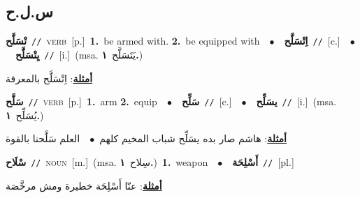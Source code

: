 \documentclass[10pt,a4paper,twoside]{article} %
\begin{document}
\begin{multicols}{2}
\vspace{-3mm}
\subsection*{\color{blue}\foreignlanguage{arabic}{س.ل.ح}\color{blue}{}} 

{\setlength\topsep{0pt}\textbf{\foreignlanguage{arabic}{تْسَلَّح}}\ {\color{gray}\texttt{//}\color{black}}\ \textsc{verb}\ [p.]\ \textbf{1.}~be armed with.  \textbf{2.}~be equipped with\ \ $\bullet$\ \ \setlength\topsep{0pt}\textbf{\foreignlanguage{arabic}{اِتْسَلَّح}}\ {\color{gray}\texttt{//}\color{black}}\ [c.]\ \ $\bullet$\ \ \setlength\topsep{0pt}\textbf{\foreignlanguage{arabic}{يِتْسَلَّح}}\ {\color{gray}\texttt{//}\color{black}}\ [i.]\ \color{gray}(msa. \foreignlanguage{arabic}{يَتَسَلَّح}~\foreignlanguage{arabic}{\textbf{١.}})\color{black}\  \begin{flushright}\color{gray}\foreignlanguage{arabic}{\textbf{\underline{\foreignlanguage{arabic}{أمثلة}}}: اِتْسَلَّح بالمعرفة}\end{flushright}\color{black}} \vspace{2mm}

{\setlength\topsep{0pt}\textbf{\foreignlanguage{arabic}{سَلَّح}}\ {\color{gray}\texttt{//}\color{black}}\ \textsc{verb}\ [p.]\ \textbf{1.}~arm  \textbf{2.}~equip\ \ $\bullet$\ \ \setlength\topsep{0pt}\textbf{\foreignlanguage{arabic}{سَلِّح}}\ {\color{gray}\texttt{//}\color{black}}\ [c.]\ \ $\bullet$\ \ \setlength\topsep{0pt}\textbf{\foreignlanguage{arabic}{يسَلِّح}}\ {\color{gray}\texttt{//}\color{black}}\ [i.]\ \color{gray}(msa. \foreignlanguage{arabic}{يُسَلِّح}~\foreignlanguage{arabic}{\textbf{١.}})\color{black}\  \begin{flushright}\color{gray}\foreignlanguage{arabic}{\textbf{\underline{\foreignlanguage{arabic}{أمثلة}}}: هاشم صار بده يسَلِّح شباب المخيم كلهم\ $\bullet$\ \  العلم سَلَّحنا بالقوة}\end{flushright}\color{black}} \vspace{2mm}

{\setlength\topsep{0pt}\textbf{\foreignlanguage{arabic}{سْلَاح}}\ {\color{gray}\texttt{//}\color{black}}\ \textsc{noun}\ [m.]\ \color{gray}(msa. \foreignlanguage{arabic}{سِلاح}~\foreignlanguage{arabic}{\textbf{١.}})\color{black}\ \textbf{1.}~weapon\ \ $\bullet$\ \ \setlength\topsep{0pt}\textbf{\foreignlanguage{arabic}{أَسْلِحَة}}\ {\color{gray}\texttt{//}\color{black}}\ [pl.]\  \begin{flushright}\color{gray}\foreignlanguage{arabic}{\textbf{\underline{\foreignlanguage{arabic}{أمثلة}}}: عنّا أَسْلِحَة خطيرة ومش مرخَّصَة}\end{flushright}\color{black}} \vspace{2mm}


\end{multicols}
\end{document}
